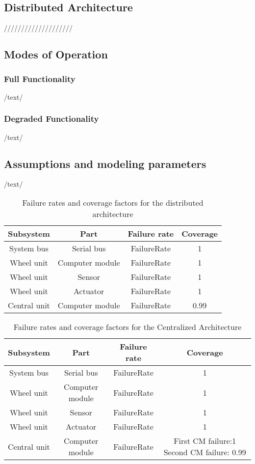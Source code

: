 \subsection{Distributed Architecture}
////////////////////
\subsection{Modes of Operation}
\subsubsection{Full Functionality}
/text/
\subsubsection{Degraded Functionality}
/text/
\subsection{Assumptions and modeling parameters}
/text/


\begin{table}[h]
\centering
\begin{tabular}{| c | c | c | c |}
\hline 
Subsystem & Part & Failure rate & Coverage\\
\hline
System bus & Serial bus& FailureRate & 1\\
\hline
Wheel unit & Computer module & FailureRate & 1\\
\hline
Wheel unit & Sensor & FailureRate & 1\\
\hline
Wheel unit & Actuator & FailureRate & 1\\
\hline
Central unit & Computer module & FailureRate & 0.99\\
\hline
\end{tabular}
\caption{Failure rates and coverage factors for the distributed architecture}
\label{tab:faildist}


\end{table}
\begin{table}[h]
\centering
\begin{tabular}{| c | c | c | c |}
\hline 
Subsystem & Part & Failure rate & Coverage\\
\hline
System bus & Serial bus& FailureRate & 1\\
\hline
Wheel unit & Computer module & FailureRate & 1\\
\hline
Wheel unit & Sensor & FailureRate & 1\\
\hline
Wheel unit & Actuator & FailureRate & 1\\
\hline
Central unit & Computer module & FailureRate & First CM failure:1 Second CM failure: 0.99\\
\hline
\end{tabular}
\caption{Failure rates and coverage factors for the Centralized Architecture}
\label{tab:failcent}
\end{table}
